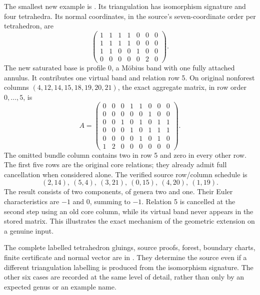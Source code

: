 The smallest new example is . Its triangulation has
isomorphism signature  and four tetrahedra. Its normal
coordinates, in the source's seven-coordinate order per tetrahedron, are
\[
\begin{pmatrix}
1&1&1&1&0&0&0\\
1&1&1&1&0&0&0\\
1&1&0&0&1&0&0\\
0&0&0&0&0&2&0
\end{pmatrix}.
\]
The new saturated base is profile 0, a M\"obius band with one fully
attached annulus. It contributes one virtual band and relation row 5.
On original nonforest columns $(4,12,14,15,18,19,20,21)$, the exact
aggregate matrix, in row order $0,\ldots,5$, is
\[
 A=\begin{pmatrix}
 0&0&0&1&1&0&0&0\\
 0&0&0&0&0&1&0&0\\
 0&0&1&0&1&0&1&1\\
 0&0&0&1&0&1&1&1\\
 0&0&0&0&1&0&1&0\\
 1&2&0&0&0&0&0&0
 \end{pmatrix}.
\]
The omitted bundle column contains two in row 5 and zero in every other
row. The first five rows are the original core relations; they already
admit full cancellation when considered alone.
The verified source row/column schedule is
\[
(2,14),\ (5,4),\ (3,21),\ (0,15),\ (4,20),\ (1,19).
\]
The result consists of two components, of genera two and one. Their
Euler characteristics are $-1$ and $0$, summing to $-1$. Relation 5 is
cancelled at the second step using an old core column, while its virtual
band never appears in the stored matrix. This illustrates the exact
mechanism of the geometric extension on a genuine input.

The complete labelled tetrahedron gluings, source proofs, forest,
boundary charts, finite certificate and normal vector are in
. They determine the
source even if a different triangulation labelling is produced from
the isomorphism signature. The other six cases are recorded at the same
level of detail, rather than only by an expected genus or an example name.
